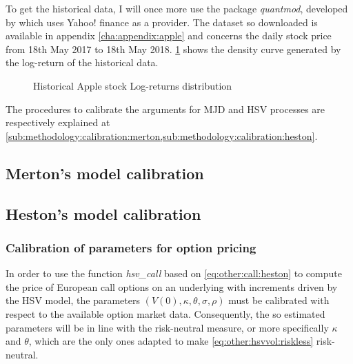 \documentclass[12pt]{report}
\begin{document}
To get the historical data, I will once more use the package \textit{quantmod}, developed by \citet{quantmod} which uses Yahoo! finance as a provider. The dataset so downloaded is available in appendix \ref{cha:appendix:apple} and concerns the daily stock price from 18th May 2017 to 18th May 2018.
\cref{p:methodology:density:aapl} shows the density curve generated by the log-return of the historical data.

\begin{figure}[ht]
  \centering
  
  \caption{Historical Apple stock Log-returns distribution}
  \label{p:methodology:density:aapl}
\end{figure}


The procedures to calibrate the arguments for MJD and HSV processes are respectively explained at \cref{sub:methodology:calibration:merton,sub:methodology:calibration:heston}.



\subsection{Merton's model calibration}
\label{sub:methodology:calibration:merton}



\subsection{Heston's model calibration}
\label{sub:methodology:calibration:heston}

\subsubsection*{Calibration of parameters for option pricing}

In order to use the function \textit{hsv\_call} based on \cref{eq:other:call:heston} to compute the price of European call options on an underlying with increments driven by the HSV model, the parameters $(V(0), \kappa, \theta, \sigma, \rho)$ must be calibrated with respect to the available option market data.
Consequently, the so estimated parameters will be in line with the risk-neutral measure, or more specifically $\kappa$ and $\theta$, which are the only ones adapted to make \cref{eq:other:hsvvol:riskless} risk-neutral.
\end{document}
